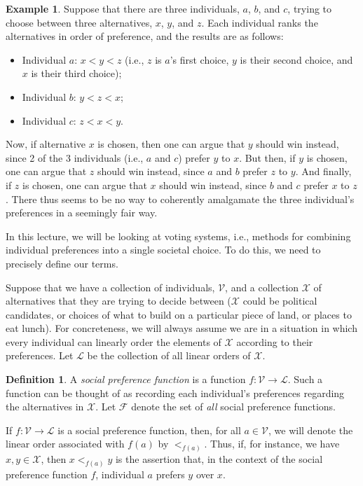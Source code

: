 \documentclass[a4paper]{memoir}
\theoremstyle{definition}
\newtheorem{definition}[theorem]{Definition}
\newtheorem{example}[theorem]{Example}
\newcommand{\mc}{\mathcal}
\newcommand{\ra}{\rightarrow}
\begin{document}
\begin{example}
  Suppose that there are three individuals, $a$, $b$, and $c$, trying to choose between 
  three alternatives, $x$, $y$, and $z$. Each individual ranks the alternatives in order of 
  preference, and the results are as follows:
  \begin{itemize}
    \item Individual $a$: $x < y < z$ (i.e., $z$ is $a$'s first choice, $y$ is their second choice, 
    and $x$ is their third choice);
    \item Individual $b$: $y < z < x$;
    \item Individual $c$: $z < x < y$.
  \end{itemize}
  Now, if alternative $x$ is chosen, then one can argue that $y$ should win instead, since 2 of the 
  3 individuals (i.e., $a$ and $c$) prefer $y$ to $x$. But then, if $y$ is chosen, one can argue that 
  $z$ should win instead, since $a$ and $b$ prefer $z$ to $y$. And finally, if $z$ is chosen, one 
  can argue that $x$ should win instead, since $b$ and $c$ prefer $x$ to $z$. There thus seems to 
  be no way to coherently amalgamate the three individual's preferences in a seemingly fair way.
\end{example}

In this lecture, we will be looking at voting systems, i.e., methods for combining 
individual preferences into a single societal choice. To do this, we need to precisely define 
our terms.

Suppose that we have a collection of individuals, $\mc{V}$, and a collection $\mc{X}$ of alternatives 
that they are trying to decide between ($\mc{X}$ could be political candidates, or choices of 
what to build on a particular piece of land, or places to eat lunch). For concreteness, 
we will always assume we are in a situation in which every individual can linearly order 
the elements of $\mc{X}$ according to their preferences. Let $\mc{L}$ be the 
collection of all linear orders of $\mc{X}$.

\begin{definition}
  A \emph{social preference function} is a function $f: \mc{V} \ra \mc{L}$. Such a function can 
  be thought of as recording each individual's preferences regarding the alternatives in 
  $\mc{X}$. Let $\mc{F}$ denote the set of \emph{all} social preference functions.
\end{definition}

If $f: \mc{V} \ra \mc{L}$ is a social preference function, then, for all $a \in \mc{V}$, we 
will denote the linear order associated with $f(a)$ by $<_{f(a)}$. Thus, if, for instance, 
we have $x,y \in \mc{X}$, then $x <_{f(a)} y$ is the assertion that, in the context of the 
social preference function $f$, individual $a$ prefers $y$ over $x$.
\end{document}
